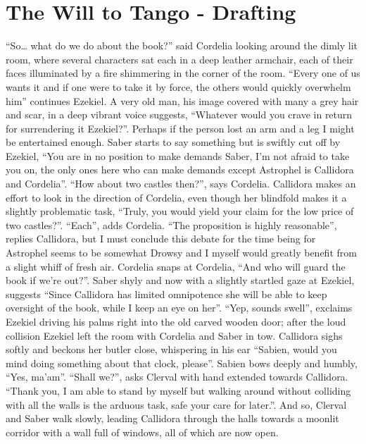 \chapter{The Will to Tango - Drafting}

``So\ldots{} what do we do about the book?'' said Cordelia looking
around the dimly lit room, where several characters sat each in a deep
leather armchair, each of their faces illuminated by a fire shimmering
in the corner of the room. ``Every one of us wants it and if one were to
take it by force, the others would quickly overwhelm him'' continues
Ezekiel. A very old man, his image covered with many a grey hair and
scar, in a deep vibrant voice suggests, ``Whatever would you crave in
return for surrendering it Ezekiel?''. Perhaps if the person lost an arm
and a leg I might be entertained enough. Saber starts to say something
but is swiftly cut off by Ezekiel, ``You are in no position to make
demands Saber, I'm not afraid to take you on, the only ones here who can
make demands except Astrophel is Callidora and Cordelia''. ``How about
two castles then?'', says Cordelia. Callidora makes an effort to look in
the direction of Cordelia, even though her blindfold makes it a slightly
problematic task, ``Truly, you would yield your claim for the low price
of two castles?''. ``Each'', adds Cordelia. ``The proposition is highly
reasonable'', replies Callidora, but I must conclude this debate for the
time being for Astrophel seems to be somewhat Drowsy and I myself would
greatly benefit from a slight whiff of fresh air. Cordelia snaps at
Cordelia, ``And who will guard the book if we're out?''. Saber shyly and
now with a slightly startled gaze at Ezekiel, suggests ``Since Callidora
has limited omnipotence she will be able to keep oversight of the book,
while I keep an eye on her''. ``Yep, sounds swell'', exclaims Ezekiel
driving his palms right into the old carved wooden door; after the loud
collision Ezekiel left the room with Cordelia and Saber in tow.
Callidora sighs softly and beckons her butler close, whispering in his
ear ``Sabien, would you mind doing something about that clock, please''.
Sabien bows deeply and humbly, ``Yes, ma'am''. ``Shall we?'', asks
Clerval with hand extended towards Callidora. ``Thank you, I am able to
stand by myself but walking around without colliding with all the walls
is the arduous task, safe your care for later.''. And so, Clerval and
Saber walk slowly, leading Callidora through the halls towards a moonlit
corridor with a wall full of windows, all of which are now open.

